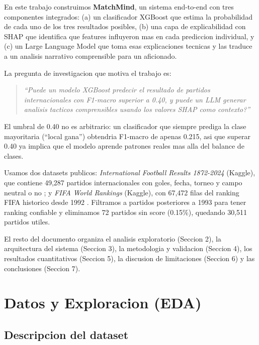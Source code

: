 \documentclass[10pt,twocolumn]{article}
\begin{document}
En este trabajo construimos \textbf{MatchMind}, un sistema end-to-end con tres componentes integrados: (a) un clasificador XGBoost que estima la probabilidad de cada uno de los tres resultados posibles, (b) una capa de explicabilidad con SHAP que identifica que features influyeron mas en cada prediccion individual, y (c) un Large Language Model que toma esas explicaciones tecnicas y las traduce a un analisis narrativo comprensible para un aficionado.

La pregunta de investigacion que motiva el trabajo es:

\begin{quote}
  \textit{``Puede un modelo XGBoost predecir el resultado de partidos internacionales con F1-macro superior a 0.40, y puede un LLM generar analisis tacticos comprensibles usando los valores SHAP como contexto?''}
\end{quote}

El umbral de 0.40 no es arbitrario: un clasificador que siempre prediga la clase mayoritaria (``local gana'') obtendria F1-macro de apenas 0.215, asi que superar 0.40 ya implica que el modelo aprende patrones reales mas alla del balance de clases.

Usamos dos datasets publicos: \textit{International Football Results 1872-2024} (Kaggle), que contiene 49,287 partidos internacionales con goles, fecha, torneo y campo neutral o no \cite{kaggle_results}; y \textit{FIFA World Rankings} (Kaggle), con 67,472 filas del ranking FIFA historico desde 1992 \cite{kaggle_fifa}. Filtramos a partidos posteriores a 1993 para tener ranking confiable y eliminamos 72 partidos sin score (0.15\%), quedando 30,511 partidos utiles.

El resto del documento organiza el analisis exploratorio (Seccion 2), la arquitectura del sistema (Seccion 3), la metodologia y validacion (Seccion 4), los resultados cuantitativos (Seccion 5), la discusion de limitaciones (Seccion 6) y las conclusiones (Seccion 7).

\section{Datos y Exploracion (EDA)}
\label{sec:eda}

\subsection{Descripcion del dataset}
\end{document}
